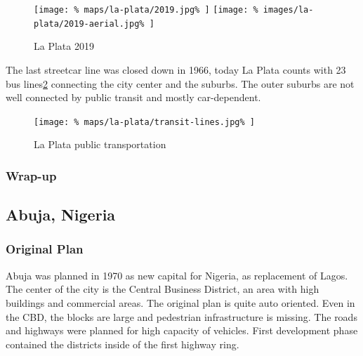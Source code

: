 \documentclass[twocolumn]{article}
\begin{document}
			\begin{figure}[h!]
				\texttt{[image: \%
					maps/la-plata/2019.jpg\%
				]}
				\texttt{[image: \%
					images/la-plata/2019-aerial.jpg\%
				]}
				\caption{La Plata 2019\cite{OpenStreetMap:LaPlata}}
				\label{fig:map:la-plata-2019}
			\end{figure}
			
			The last streetcar line was closed down in 1966, today La Plata counts with 23 bus lines\ref{fig:map:la-plata-transit} connecting the city center and the suburbs.
			The outer suburbs are not well connected by public transit and mostly car-dependent.
			
			\begin{figure}[h!]
				\texttt{[image: \%
					maps/la-plata/transit-lines.jpg\%
				]}
				\caption{La Plata public transportation\cite{OpenStreetMap:LaPlata}}
				\label{fig:map:la-plata-transit}
			\end{figure}
			
			
			
			\subsubsection{Wrap-up}
			
			
			
		\clearpage
		\begin{strip}
		\subsection{Abuja, Nigeria}
		\end{strip}
		
			
			
			\subsubsection{Original Plan}
			
			Abuja was planned in 1970 as new capital for Nigeria, as replacement of Lagos.
			The center of the city is the Central Business District, an area with high buildings and commercial areas.
			The original plan is quite auto oriented. Even in the CBD, the blocks are large and pedestrian infrastructure is missing. The roads and highways were planned for high capacity of vehicles.
			First development phase contained the districts inside of the first highway ring.
			
\end{document}
